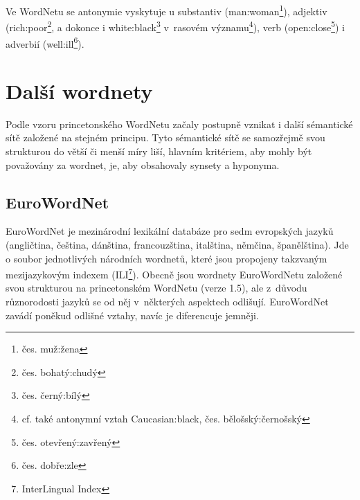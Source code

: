 \documentclass[a4paper, 11pt, oneside, showtrims]{book}
\newcommand\ex{\textsf}
\begin{document}


					Ve WordNetu se antonymie vyskytuje u substantiv (\ex{man:woman}\footnote{čes. \ex{muž:žena}}), adjektiv (\ex{rich:poor}\footnote{čes. \ex{bohatý:chudý}}, a dokonce i \ex{white:black}\footnote{čes. \ex{černý:bílý}} v~rasovém významu\footnote{cf. také antonymní vztah \ex{Caucasian:black}, čes. \ex{bělošský:černošský}}), verb (\ex{open:close}\footnote{čes. \ex{otevřený:zavřený}}) i adverbií (\ex{well:ill}\footnote{čes. \ex{dobře:zle}}). \parencite{princetonWN}



		\chapter{Další wordnety}
		\label{cha:dalsi_wordnety}

		
			Podle vzoru princetonského WordNetu začaly postupně vznikat i další sémantické sítě založené na stejném principu. Tyto sémantické sítě se samozřejmě svou strukturou do větší či menší míry liší, hlavním kritériem, aby mohly být považovány za wordnet, je, aby obsahovaly synsety a hyponyma. \parencite{gwa2013wordnetsworld} %

			\section{EuroWordNet} %
			\label{sec:eurowordnet}
				

				EuroWordNet je mezinárodní lexikální databáze pro sedm evropských jazyků (angličtina, čeština, dánština, francouzština, italština, němčina, španělština). Jde o soubor jednotlivých národních wordnetů, které jsou propojeny takzvaným mezijazykovým indexem (ILI\footnote{InterLingual Index}). Obecně jsou wordnety EuroWordNetu založené svou strukturou na princetonském WordNetu (verze 1.5), ale z~důvodu různorodosti jazyků se od něj v~některých aspektech odlišují. EuroWordNet zavádí poněkud odlišné vztahy, navíc je diferencuje jemněji. \parencite{pazienza2008bottom}
\end{document}
